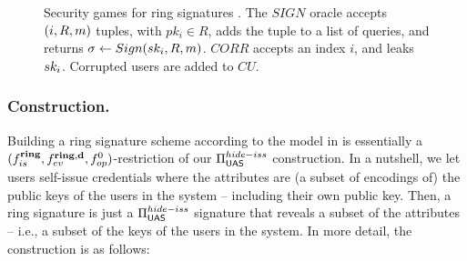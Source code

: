 \begin{figure}[ht!]
  \centering
  \caption{Security games for ring signatures \cite{bkm06}. The $SIGN$ oracle
    accepts $(i,R,m)$ tuples, with $pk_i \in R$, adds the tuple to a list of
    queries, and returns $\sigma \gets Sign(sk_i,R,m)$. $CORR$
    accepts an index $i$, and leaks $sk_i$. Corrupted users are added
    to $CU$.}
  \label{fig:model-rs}  
\end{figure}


\subsubsection{\CUASRing Construction.} %
Building a ring signature scheme according to the model in 
is essentially a $(f_{is}^{\mathbf{ring}},f_{ev}^{\mathbf{ring},\mathbf{d}},f_{op}^0)$-restriction
of our $\Pi_{\mathsf{UAS}}^{hide-iss}$ construction. In a nutshell, we let users self-issue
credentials where the attributes are (a subset of encodings of) the public keys
of the users in the system -- including their own public key. Then, a ring
signature is just a $\Pi_{\mathsf{UAS}}^{hide-iss}$ signature that reveals a subset of
the attributes -- i.e., a subset of the keys of the users in the system. In more
detail, the construction is as follows:

